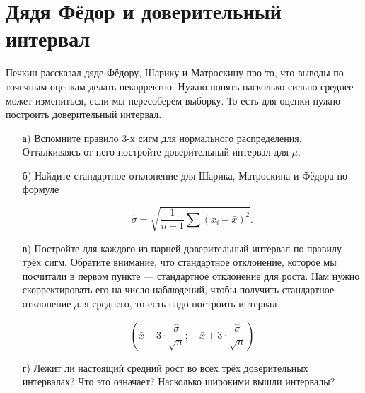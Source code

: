 \documentclass[12pt, a4paper, oneside]{article}
\begin{document}
\section{Дядя Фёдор и доверительный интервал}

Печкин рассказал дяде Фёдору, Шарику и Матроскину про то, что выводы по точечным оценкам делать некорректно. Нужно понять насколько сильно среднее может измениться, если мы пересоберём выборку. То есть для оценки нужно построить доверительный интервал.

\begin{enumerate}
	
	\item[а)] Вспомните правило $3$-х сигм для нормального распределения. Отталкиваясь от него постройте доверительный интервал для $\mu$. 
	
	\item[б)] Найдите стандартное отклонение для Шарика, Матроскина и Фёдора по формуле 
	
	\[\hat \sigma = \sqrt{ \frac{1}{n-1}  \sum (x_i - \bar x)^2}.\]
	
	\item[в)] Постройте для каждого из парней доверительный интервал по правилу трёх сигм. Обратите внимание, что стандартное отклонение, которое мы посчитали в первом пункте --- стандартное отклонение для роста. Нам нужно скорректировать его на число наблюдений, чтобы получить стандартное отклонение для среднего, то есть надо построить интервал
	
	\[ \left( \bar x - 3 \cdot \frac{\hat \sigma}{\sqrt{n}}; \quad \bar x + 3 \cdot \frac{\hat \sigma}{\sqrt{n}} \right)\] 
	
	\item[г)] Лежит ли настоящий средний рост во всех трёх доверительных интервалах? Что это означает? Насколько широкими вышли интервалы? 
\end{enumerate}
\end{document}
